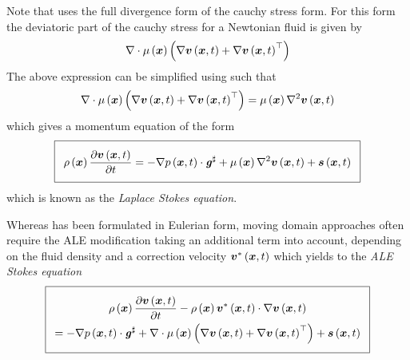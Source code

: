 Note that  uses the full divergence form of the cauchy stress form. For this form the deviatoric part of the cauchy stress for a Newtonian fluid is given by
\begin{equation}
  \divergence{}{\fnof{\mu}{\vectr{x}}\pbrac{\gradient{}{\fnof{\vectr{v}}{\vectr{x},t}
        +\transpose{\gradient{}{\fnof{\vectr{v}}{\vectr{x},t}}}}}}
\end{equation}
The above expression can be simplified using  such that
\begin{equation}
  \divergence{}{\fnof{\mu}{\vectr{x}}\pbrac{\gradient{}{\fnof{\vectr{v}}{\vectr{x},t}
       +\transpose{\gradient{}{\fnof{\vectr{v}}{\vectr{x},t}}}}}}
      =\fnof{\mu}{\vectr{x}}\laplacian{}{\fnof{\vectr{v}}{\vectr{x},t}}
\end{equation}
which gives a momentum equation of the form
\begin{equation}
  \addtolength{\fboxsep}{5pt}
  \boxed{
    \fnof{\rho}{\vectr{x}}\delby{\fnof{\vectr{v}}{\vectr{x},t}}{t}=
    \dotprod{-\gradient{}{\fnof{p}{\vectr{x},t}}}{\sharptensor{\tensor{g}}}
    +\fnof{\mu}{\vectr{x}}\laplacian{}{\fnof{\vectr{v}}{\vectr{x},t}}
    +\fnof{\vectr{s}}{\vectr{x},t}
  }
  \label{eqn:StokesEquationLaplaceMomentum}
\end{equation}
which is known as the \emph{Laplace Stokes equation}.

Whereas  has been formulated in Eulerian
form, moving domain approaches often require the ALE modification taking an
additional term into account, depending on the fluid density and a correction
velocity $  \boldsymbol{v} ^*\left(  \boldsymbol{x} ,t \right) $ which yields to the \emph{ALE Stokes
  equation} \ie
\begin{equation}
  \addtolength{\fboxsep}{5pt}
  \boxed{
    \begin{gathered}
      \fnof{\rho}{\vectr{x}}\delby{\fnof{\vectr{v}}{\vectr{x},t}}{t}
      -\fnof{\rho}{\vectr{x}}\dotprod{\fnof{\vectr{v}^{*}}{\vectr{x},t}}{
        \gradient{}{\fnof{\vectr{v}}{\vectr{x},t}}}\\
      =\dotprod{-\gradient{}{\fnof{p}{\vectr{x},t}}}{\sharptensor{\tensor{g}}}
      +\divergence{}{\fnof{\mu}{\vectr{x}}\pbrac{\gradient{}{\fnof{\vectr{v}}{\vectr{x},t}+
            \transpose{\gradient{}{\fnof{\vectr{v}}{\vectr{x},t}}}}}}
      +\fnof{\vectr{s}}{\vectr{x},t}
    \end{gathered}
    }
  \label{eqn:StokesEquationALEMomentum}
\end{equation}

